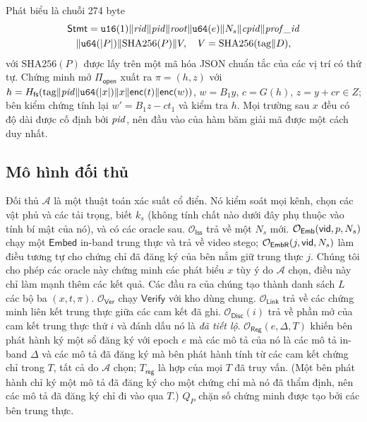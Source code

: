 Phát biểu là chuỗi 274 byte
\begin{multline*}
\mathsf{Stmt}=\mathtt{u16}(1)\|\mathit{rid}\|\mathit{pid}\|\mathit{root}\|\mathtt{u64}(e)\|N_s\|
\mathit{cpid}\|\mathit{prof\_id}\\
\|\mathtt{u64}(|P|)\|\mathrm{SHA256}(P)\|V,\quad
V=\mathrm{SHA256}(\text{tag}\|D),
\end{multline*}
với $\mathrm{SHA256}(P)$ được lấy trên một mã hóa JSON chuẩn tắc của các vị trí
có thứ tự. Chứng minh mở $\Pi_{\mathsf{open}}$ xuất ra $\pi=(h,z)$ với
$h=H_{\mathsf{fs}}(\text{tag}\|\mathit{pid}\|\mathtt{u64}(|x|)\|x\|\mathsf{enc}(t)\|\mathsf{enc}(w))$,
$w=B_1y$, $c=G(h)$, $z=y+cr\in Z$; bên kiểm chứng tính lại $w'=B_1z-ct_1$ và
kiểm tra $h$. Mọi trường sau $x$ đều có độ dài được cố định bởi $\mathit{pid}$, nên đầu
vào của hàm băm giải mã được một cách duy nhất.

\subsection{Mô hình đối thủ}
\label{sec:sec-adversary}

Đối thủ $\mathcal A$ là một thuật toán xác suất cổ điển. Nó kiểm soát mọi kênh,
chọn các vật phủ và các tải trọng, biết $k_s$ (không tính chất nào dưới đây phụ
thuộc vào tính bí mật của nó), và có các oracle sau. $\mathcal O_{\mathsf{Iss}}$
trả về một $N_s$ mới. $\mathcal O_{\mathsf{Emb}}(\mathsf{vid},p,N_s)$ chạy một
$\mathsf{Embed}$ in-band trung thực và trả về video stego;
$\mathcal O_{\mathsf{EmbR}}(j,\mathsf{vid},N_s)$ làm điều tương tự cho chứng chỉ đã đăng
ký của bên nắm giữ trung thực $j$. Chúng tôi cho phép các oracle này chứng minh
các phát biểu $x$ tùy ý do $\mathcal A$ chọn, điều này chỉ làm mạnh thêm các kết
quả. Các đầu ra của chúng tạo thành danh sách $L$ các bộ ba $(x,t,\pi)$.
$\mathcal O_{\mathsf{Ver}}$ chạy $\mathsf{Verify}$ với kho dùng chung.
$\mathcal O_{\mathsf{Link}}$ trả về các chứng minh liên kết trung thực giữa các
cam kết đã ghi. $\mathcal O_{\mathsf{Disc}}(i)$ trả về phần mở của cam kết trung
thực thứ $i$ và đánh dấu nó là \emph{đã tiết lộ}.
$\mathcal O_{\mathsf{Reg}}(e,\Delta,T)$ khiến bên phát hành ký một sổ đăng ký
với epoch $e$ mà các mô tả của nó là các mô tả in-band $\Delta$ và các mô tả đã
đăng ký mà bên phát hành tính từ các cam kết chứng chỉ trong $T$, tất cả do
$\mathcal A$ chọn; $T_{\mathsf{reg}}$ là hợp của mọi $T$ đã truy vấn. (Một bên
phát hành chỉ ký một mô tả đã đăng ký cho một chứng chỉ mà nó đã thẩm định, nên
các mô tả đã đăng ký chỉ đi vào qua $T$.) $Q_P$ chặn số chứng minh được tạo bởi
các bên trung thực.


